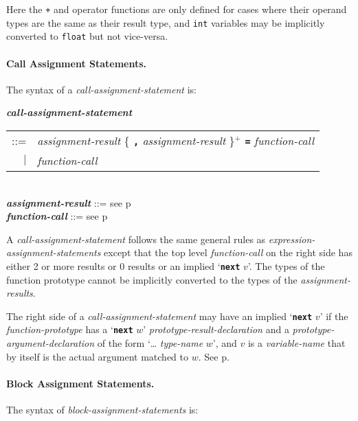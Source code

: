 \documentclass[12pt]{article}
\newcommand{\subsubsubsection}[1]{\paragraph[#1]{#1.}}
\newcommand{\TT}[1]{{\tt \bfseries #1}}
\newcommand{\PLUS}[1][]{{$^{+#1}$}}
\newcommand{\emkey}[1]{{\em \bfseries #1}}
\newcommand{\pagref}[1]{p\pageref{#1}}
\newenvironment{indpar}[1][0.3in]%
	{\begin{list}{}%
		     {\setlength{\itemsep}{0in}%
		      \setlength{\topsep}{0in}%
		      \setlength{\parsep}{1ex}%
		      \setlength{\labelwidth}{#1}%
		      \setlength{\leftmargin}{#1}%
		      \addtolength{\leftmargin}{\labelsep}}%
	 \item}%
	{\end{list}}
\begin{document}
Here the {\tt +} and {\tt *} operator functions are only defined
for cases where their operand types are the same as their result type,
and {\tt int} variables may be implicitly converted to {\tt float}
but not vice-versa.

\subsubsubsection{Call Assignment Statements}
\label{CALL-ASSIGNMENT-STATEMENTS}

The syntax of a {\em call-assignment-statement} is:
\begin{indpar}
\emkey{call-assignment-statement} \\
\hspace*{0.5in} \begin{tabular}{rl}
                ::= & {\em assignment-result}
                      \{ \TT{,} {\em assignment-result} \}\PLUS{}
		      \TT{=} {\em function-call} \\
		$|$ & {\em function-call}
		\end{tabular}
\\[0.5ex]
\emkey{assignment-result} ::= see \pagref{ASSIGNMENT-RESULT}
\\[0.5ex]
\emkey{function-call} ::= see \pagref{FUNCTION-CALL}
\end{indpar}

A {\em call-assignment-statement} follows the same general rules
as {\em expression-assignment-state\-ments} except that the top
level {\em function-call} on the right side has either 2 or more
results or 0 results or an implied `\TT{next} $v$'.
The types of the function prototype cannot
be implicitly converted to the types of the {\em assignment-results}.

\label{CALL-NEXT-PROMOTION}
The right side of a {\em call-assignment-statement} may have
an implied `\TT{next} $v$' if the {\em function-prototype} has 
a `\TT{next} $w$' {\em prototype-result-declaration}
and a {\em prototype-argument-declaration} of the
form `\dots{} {\em type-name} $w$', and $v$ is a {\em variable-name}
that by itself is the actual argument matched to $w$.
See \pagref{PROTOTYPE-NEXT-RESULT}.

\subsubsubsection{Block Assignment Statements}
\label{BLOCK-ASSIGNMENT-STATEMENTS}

The syntax of {\em block-assignment-statements} is:
\end{document}
